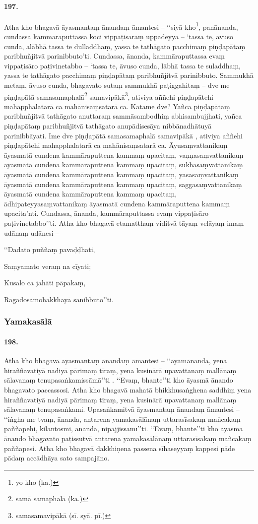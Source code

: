 \paragraph{197.} Atha kho bhagavā āyasmantaṃ ānandaṃ āmantesi – ‘‘siyā kho\footnote{yo kho (ka.)}, panānanda, cundassa kammāraputtassa koci vippaṭisāraṃ uppādeyya – ‘tassa te, āvuso cunda, alābhā tassa te dulladdhaṃ, yassa te tathāgato pacchimaṃ piṇḍapātaṃ paribhuñjitvā parinibbuto’ti. Cundassa, ānanda, kammāraputtassa evaṃ vippaṭisāro paṭivinetabbo – ‘tassa te, āvuso cunda, lābhā tassa te suladdhaṃ, yassa te tathāgato pacchimaṃ piṇḍapātaṃ paribhuñjitvā parinibbuto. Sammukhā metaṃ, āvuso cunda, bhagavato sutaṃ sammukhā paṭiggahitaṃ – dve me piṇḍapātā samasamaphalā\footnote{samā samaphalā (ka.)} samavipākā\footnote{samasamavipākā (sī. syā. pī.)}, ativiya aññehi piṇḍapātehi mahapphalatarā ca mahānisaṃsatarā ca. Katame dve? Yañca piṇḍapātaṃ paribhuñjitvā tathāgato anuttaraṃ sammāsambodhiṃ abhisambujjhati, yañca piṇḍapātaṃ paribhuñjitvā tathāgato anupādisesāya nibbānadhātuyā parinibbāyati. Ime dve piṇḍapātā samasamaphalā samavipākā , ativiya aññehi piṇḍapātehi mahapphalatarā ca mahānisaṃsatarā ca. Āyusaṃvattanikaṃ āyasmatā cundena kammāraputtena kammaṃ upacitaṃ, vaṇṇasaṃvattanikaṃ āyasmatā cundena kammāraputtena kammaṃ upacitaṃ, sukhasaṃvattanikaṃ āyasmatā cundena kammāraputtena kammaṃ upacitaṃ, yasasaṃvattanikaṃ āyasmatā cundena kammāraputtena kammaṃ upacitaṃ, saggasaṃvattanikaṃ āyasmatā cundena kammāraputtena kammaṃ upacitaṃ, ādhipateyyasaṃvattanikaṃ āyasmatā cundena kammāraputtena kammaṃ upacita’nti. Cundassa, ānanda, kammāraputtassa evaṃ vippaṭisāro paṭivinetabbo’’ti. Atha kho bhagavā etamatthaṃ viditvā tāyaṃ velāyaṃ imaṃ udānaṃ udānesi –

‘‘Dadato puññaṃ pavaḍḍhati,

Saṃyamato veraṃ na cīyati;

Kusalo ca jahāti pāpakaṃ,

Rāgadosamohakkhayā sanibbuto’’ti.


\subsubsection{Yamakasālā}

\paragraph{198.} Atha kho bhagavā āyasmantaṃ ānandaṃ āmantesi – ‘‘āyāmānanda, yena hiraññavatiyā nadiyā pārimaṃ tīraṃ, yena kusinārā upavattanaṃ mallānaṃ sālavanaṃ tenupasaṅkamissāmā’’ti . ‘‘Evaṃ, bhante’’ti kho āyasmā ānando bhagavato paccassosi. Atha kho bhagavā mahatā bhikkhusaṅghena saddhiṃ yena hiraññavatiyā nadiyā pārimaṃ tīraṃ, yena kusinārā upavattanaṃ mallānaṃ sālavanaṃ tenupasaṅkami. Upasaṅkamitvā āyasmantaṃ ānandaṃ āmantesi – ‘‘iṅgha me tvaṃ, ānanda, antarena yamakasālānaṃ uttarasīsakaṃ mañcakaṃ paññapehi, kilantosmi, ānanda, nipajjissāmī’’ti. ‘‘Evaṃ, bhante’’ti kho āyasmā ānando bhagavato paṭissutvā antarena yamakasālānaṃ uttarasīsakaṃ mañcakaṃ paññapesi. Atha kho bhagavā dakkhiṇena passena sīhaseyyaṃ kappesi pāde pādaṃ accādhāya sato sampajāno.

